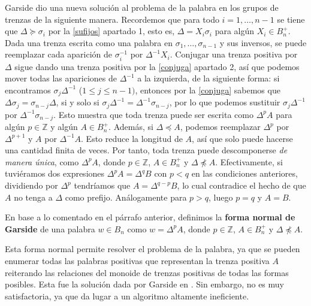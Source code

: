 \documentclass[bibtex, anon]{TEMat-article}
\newcommand{\Z}{\mathbb{Z}}
\begin{document}
Garside dio una nueva solución al problema de la palabra en los grupos de trenzas de la siguiente manera. Recordemos que para todo $i=1,\dots, n-1$ se tiene que $\Delta\succcurlyeq\sigma_i$ por la \cref{sufijos} apartado 1, esto es, $\Delta=X_i\sigma_i$ para algún $X_i\in B_n^+$. Dada una trenza escrita como una palabra en $\sigma_1,\dots,\sigma_{n-1}$ y sus inversos, se puede reemplazar cada aparición de $\sigma_i^{-1}$ por $\Delta^{-1}X_i$. Conjugar una trenza positiva por $\Delta$ sigue dando una trenza positiva por la \cref{conjuga} apartado 2, así que podemos mover todas las apariciones de $\Delta^{-1}$ a la izquierda, de la siguiente forma: si encontramos $\sigma_j\Delta^{-1}$ ($1\leq j\leq n-1)$, entonces por la \cref{conjuga} sabemos que $\Delta\sigma_{j}=\sigma_{n-j}\Delta$, si y solo si  $\sigma_j\Delta^{-1}=\Delta^{-1}\sigma_{n-j}$, por lo que podemos sustituir $\sigma_j\Delta^{-1}$ por $\Delta^{-1}\sigma_{n-j}$. Esto muestra que toda trenza puede ser escrita como $\Delta^p A$ para algún $p\in\Z$ y algún $A\in B_n^+$. Además, si $\Delta\preccurlyeq A$, podemos reemplazar $\Delta^p$ por $\Delta^{p+1}$ y $A$ por $\Delta^{-1}A$. Esto reduce la longitud de $A$, así que solo puede hacerse una cantidad finita de veces. Por tanto, toda trenza puede descomponerse \emph{de manera única}, como $\Delta^pA$, donde $p\in\Z$, $A\in B_n^+$ y $\Delta\not\preccurlyeq A$. Efectivamente, si tuviéramos dos expresiones $\Delta^pA=\Delta^q B$ con $p<q$ en las condiciones anteriores, dividiendo por $\Delta^p$ tendríamos que $A=\Delta^{q-p}B$, lo cual contradice el hecho de que $A$ no tenga a $\Delta$ como prefijo. Análogamente para $p>q$, luego $p=q$ y $A=B$.

\begin{definicion}
	En base a lo comentado en el párrafo anterior, definimos la \textbf{forma normal de Garside} de una palabra $w\in B_n$ como $w=\Delta^pA$, donde $p\in\Z$, $A\in B_n^+$ y $\Delta\not\preccurlyeq A$. 
\end{definicion}

Esta forma normal permite resolver el problema de la palabra, ya que se pueden enumerar todas las palabras positivas que representan la trenza positiva $A$ reiterando las relaciones del monoide de trenzas positivas de todas las formas posibles. Esta fue la solución dada por Garside en \cite{Garside}. Sin embargo, no es muy satisfactoria, ya que da lugar a un algoritmo altamente ineficiente.
\end{document}
